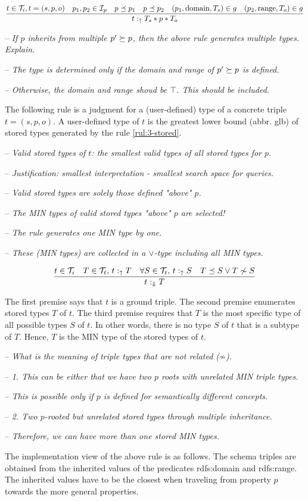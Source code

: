 \documentclass[runningheads]{llncs}
\newcommand{\uarr}{\uparrow}
\newcommand{\Darr}{\Downarrow}
\newcommand{\I}{{\cal I}}
\newcommand{\T}{{\cal T}}
\newcommand{\Ti}{{\cal T}_i}
\newcommand{\notes}[1]{\noindent\begin{small}-- \emph{#1}\hfill\break\end{small}}
\newcommand{\nnotes}[1]{\indent\begin{small}-- \emph{#1}\hfill\break\end{small}}
\begin{document}
\begin{equation}
\label{rul:3-stored1}
\dfrac{t\in\Ti, t=(s,p,o)\quad p_1,p_2\in\I_p\quad p\preceq\/p_1\quad p\preceq\/p_2\quad (p_1,\text{domain},T_s)\in\/g
                \quad (p_2,\text{range},T_o)\in\/g}
      {t:_\uarr\/T_s*p*T_o}
\end{equation}

\notes{If $p$ inherits from multiple $p'\succeq\/p$, then the above rule generates multiple types. Explain.}
\nnotes{The type is determined only if the domain and range of $p'\succeq\/p$ is defined.}
\nnotes{Otherwise, the domain and range shoud be $\top$. This should be included.}

The following rule is a judgment for a (user-defined) type of a
concrete triple $t=(s,p,o)$. A user-defined type of $t$ is the
greatest lower bound (abbr. glb) of stored types generated by the rule
\ref{rul:3-stored}.

\medskip
\notes{Valid stored types of $t$: the smallest valid types of all stored types for $p$.}
\nnotes{Justification: smallest interpretation - smallest search space for queries.}
\nnotes{Valid stored types are solely those defined "above" $p$.}
\nnotes{The MIN types of valid stored types "above" $p$ are selected!}
\nnotes{The rule generates one MIN type by one.}
\nnotes{These (MIN types) are collected in a $\lor$-type including all MIN types.}

\begin{equation}
\dfrac{t\in\T_i\quad T\in\T_t,\, t:_\uarr\/T\quad \forall\/S\in\T_t,\, t:_\uarr\/S\quad T\preceq\/S\lor\/T\not\sim\/S}
      {t:_{\Darr}\/T}
\end{equation}

The first premise says that $t$ is a ground triple. The second premise
enumerates stored types $T$ of $t$. The third premise requires that
$T$ is the most specific type of all possible types $S$ of $t$. In
other words, there is no type $S$ of $t$ that is a subtype of
$T$. Hence, $T$ is the MIN type of the stored types of $t$.

\notes{What is the meaning of triple types that are \emph{not related} ($\not\sim$).}
\nnotes{1. This can be either that we have two $p$ roots with unrelated MIN triple types.}
\nnotes{This is possible only if $p$ is defined for semantically different concepts.}
\nnotes{2. Two $p$-rooted but unrelated stored types through multiple inheritance.}
\nnotes{Therefore, we can have more than one stored MIN types.}

The implementation view of the above rule is as follows. The schema
triples are obtained from the inherited values of the predicates
rdfs:domain and rdfs:range. The inherited values have to be the
closest when traveling from property $p$ towards the more general
properties.
\end{document}
